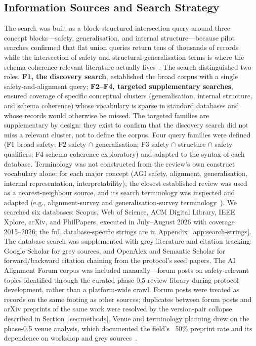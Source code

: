 \subsection{Information Sources and Search Strategy}
The search was built as a block-structured intersection query around three concept blocks---safety, generalisation, and internal structure---because pilot searches confirmed that flat union queries return tens of thousands of records while the intersection of safety and structural-generalisation terms is where the schema-coherence-relevant literature actually lives~\cite{hendrycks2023overview,sinha2024systematic}. The search distinguished two roles. \textbf{F1, the discovery search}, established the broad corpus with a single safety-and-alignment query; \textbf{F2--F4, targeted supplementary searches}, ensured coverage of specific conceptual clusters (generalisation, internal structure, and schema coherence) whose vocabulary is sparse in standard databases and whose records would otherwise be missed. The targeted families are supplementary by design: they exist to confirm that the discovery search did not miss a relevant cluster, not to define the corpus. Four query families were defined (F1 broad safety; F2 safety $\cap$ generalisation; F3 safety $\cap$ structure $\cap$ safety qualifiers; F4 schema-coherence exploratory) and adapted to the syntax of each database. Terminology was not constructed from the review's own construct vocabulary alone: for each major concept (AGI safety, alignment, generalisation, internal representation, interpretability), the closest established review was used as a nearest-neighbour source, and its search terminology was inspected and adapted (e.g., alignment-survey and generalisation-survey terminology~\cite{ji2023survey,sinha2024systematic,liu2021towards}). We searched six databases: Scopus, Web of Science, ACM Digital Library, IEEE Xplore, arXiv, and PhilPapers, executed in July--August 2026 with coverage 2015--2026; the full database-specific strings are in Appendix~\ref{app:search-strings}. The database search was supplemented with grey literature and citation tracking: Google Scholar for grey sources, and OpenAlex and Semantic Scholar for forward/backward citation chaining from the protocol's seed papers. The AI Alignment Forum corpus was included manually---forum posts on safety-relevant topics identified through the curated phase-0.5 review library during protocol development, rather than a platform-wide crawl. Forum posts were treated as records on the same footing as other sources; duplicates between forum posts and arXiv preprints of the same work were resolved by the version-pair collapse described in Section~\ref{sec:methods}. Venue and terminology planning drew on the phase-0.5 venue analysis, which documented the field's ~50\% preprint rate and its dependence on workshop and grey sources~\cite{gyevnar2025aisafety}.

